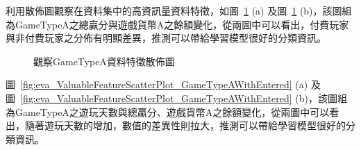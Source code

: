 利用散佈圖觀察在資料集中的高資訊量資料特徵，如圖~\ref{fig:eva_ValuableFeatureScatterPlot_GameTypeA} (a) 及圖~\ref{fig:eva_ValuableFeatureScatterPlot_GameTypeA} (b)，該圖組為GameTypeA之總贏分與遊戲貨幣A之餘額變化，從兩圖中可以看出，付費玩家與非付費玩家之分佈有明顯差異，推測可以帶給學習模型很好的分類資訊。

\begin{figure}[!htb]
    \centering
    \caption[觀察GameTypeA資料特徵散佈圖]{觀察GameTypeA資料特徵散佈圖}
    \label{fig:eva_ValuableFeatureScatterPlot_GameTypeA}
\end{figure}
\newpage

圖~\ref{fig:eva_ValuableFeatureScatterPlot_GameTypeAWithEntered} (a) 及圖~\ref{fig:eva_ValuableFeatureScatterPlot_GameTypeAWithEntered} (b)，該圖組為GameTypeA之遊玩天數與總贏分、遊戲貨幣A之餘額變化，從兩圖中可以看出，隨著遊玩天數的增加，數值的差異性則拉大，推測可以帶給學習模型很好的分類資訊。


